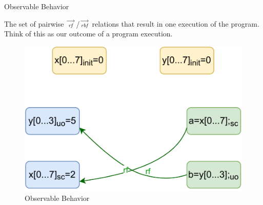     \begin{definition}{Observable Behavior}
    
        The set of pairwise $\stackrel{\longrightarrow}{_\textit{rf}}$/$\stackrel{\longrightarrow}{_\textit{rbf}}$ relations that result in one execution of the program. Think of this as our outcome of a program execution.
    
        \begin{figure}[H]
            \centering
            \includegraphics[scale=0.7]{ECMAScriptMemoryModel/Observables.pdf}
            \caption{Observable Behavior}
            \label{fig:my_label}
        \end{figure}
        
    \end{definition}
    